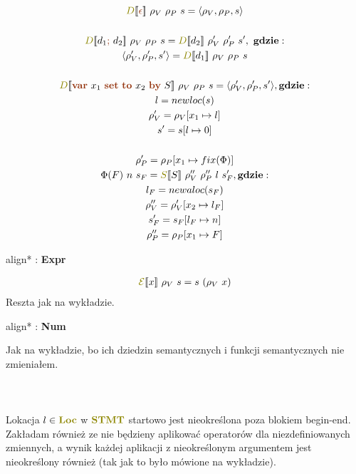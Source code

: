 \documentclass{article}
\newcommand{\syn}[1]{{\bf \textcolor{RawSienna}{#1}}}
\newcommand{\sem}[1]{{\bf \textcolor{olive}{#1}}}
\newcommand{\semcol}[1]{{\textcolor{olive}{#1}}}
\newcommand{\sembr}[1]{[\![#1]\!]}
\newcommand{\boxedeq}[1]{\begin{empheq}[box={\fboxsep=6pt\fbox}]{align*}#1\end{empheq}}
\newcommand{\bigeps}{\mathcal{E}}
\begin{document}
   \begin{gather*}
      \semcol{D}\sembr{ \syn{\epsilon} } \ \rho_V \ \rho_P \ s =
      \langle \rho_V, \rho_P, s \rangle \\
      \\
      \semcol{D}\sembr{ d_{1} \syn{;} \ d_{2} } \ \rho_V \ \rho_P \ s =
      \semcol{D}\sembr{ d_{2} } \ \rho_V' \ \rho_P' \ s', \ {\bf gdzie}: \\
      \langle \rho_V', \rho_P', s' \rangle = \semcol{D}\sembr{ d_{1} } \ \rho_V \ \rho_P \ s \\
      \\
      \semcol{D}\sembr{ \syn{var} \ x_{1} \ \syn{set \ to} \ x_{2} \ \syn{by} \ S } \ \rho_V \ \rho_P \ s =
      \langle \rho_V', \rho_P', s' \rangle, {\bf gdzie}: \\
      l = newloc(s) \\
      \rho_V' = \rho_V[x_{1} \mapsto l] \\
      s' = s[l \mapsto 0] \\
      \\
      \rho_P' = \rho_P[x_{1} \mapsto fix(\Phi)] \\
      \Phi(F) \ n \ s_{F} = \semcol{S}\sembr{S} \ \rho_V'' \ \rho_P'' \ l \ s_{F}', {\bf gdzie}: \\
      l_{F} = newaloc(s_{F}) \\
      \rho_V'' = \rho_V'[x_{2} \mapsto l_{F}] \\
      s_{F}' = s_{F}[l_{F} \mapsto n] \\
      \rho_P'' = \rho_P[x_{1} \mapsto F] \\
   \end{gather*}


   \boxedeq{ \semcol{\bigeps}: \syn{Expr} \to \sem{EXPR} }

   \begin{gather*}
      \semcol{\bigeps}\sembr{x} \ \rho_V \ s = s \ (\rho_V \ x)
   \end{gather*}
   Reszta jak na wykładzie. \\


   \boxedeq{ \semcol{}: \syn{Num} \to \sem{Int} }
   Jak na wykładzie, bo ich dziedzin semantycznych i funkcji semantycznych nie zmieniałem. \\
   \\
   \\
   \\
   Lokacja $l \in \sem{Loc}$ w $\sem{STMT}$ startowo jest nieokreślona poza blokiem begin-end.
   Zakładam również ze nie będzieny aplikować operatorów dla niezdefiniowanych zmiennych,
   a wynik każdej aplikacji z nieokreślonym argumentem jest nieokreślony również (tak jak to było mówione na wykładzie).
\end{document}
